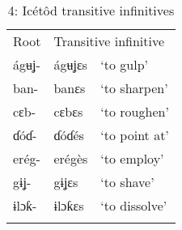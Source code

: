 \begin{table}
\caption{4: Icétôd transitive infinitives}
\label{tab:8}


\begin{tabularx}{\textwidth}{XXX}
\lsptoprule

Root & \multicolumn{2}{X}{Transitive infinitive}\\
ágʉʝ- & ágʉʝɛs & ‘to gulp’\\
ban- & banɛs & ‘to sharpen’\\
cɛb- & cɛbɛs & ‘to roughen’\\
ɗóɗ- & ɗóɗés & ‘to point at’\\
erég- & erégès & ‘to employ’\\
gɨʝ- & gɨʝɛs & ‘to shave’\\
ɨlɔƙ- & ɨlɔƙɛs & ‘to dissolve’\\
\lspbottomrule
\end{tabularx}
\end{table}
